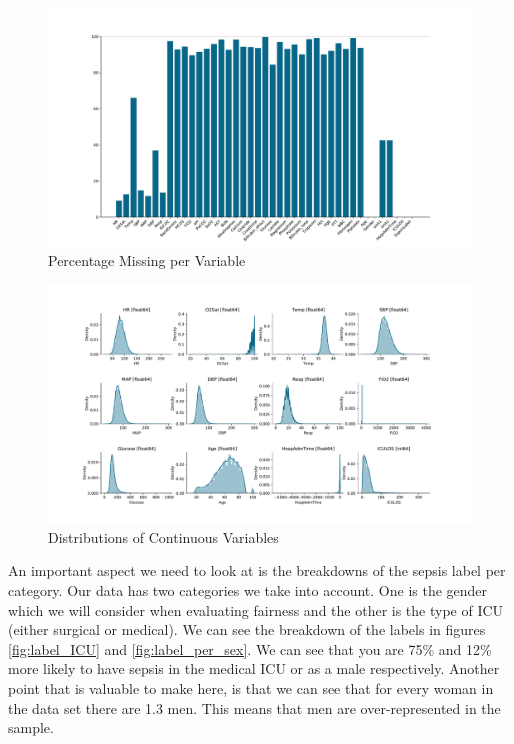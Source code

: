 \documentclass[10pt,letterpaper]{article}
\begin{document}
\begin{figure}[htbp!]
    \centering
    \includegraphics[scale = 0.45]{var_missing_hist.pdf}
    \caption{Percentage Missing per Variable}
    \label{fig:var_missings}
\end{figure}

\begin{figure}[htbp!]
    \centering
    \includegraphics[scale = 0.45]{var_dists.pdf}
    \caption{Distributions of Continuous Variables}
    \label{fig:var_dists}
\end{figure}

\par An important aspect we need to look at is the breakdowns of the sepsis label per category. Our data has two categories we take into account. One is the gender which we will consider when evaluating fairness and the other is the type of ICU (either surgical or medical). We can see the breakdown of the labels in figures \ref{fig:label_ICU} and \ref{fig:label_per_sex}. We can see that you are 75\% and 12\% more likely to have sepsis in the medical ICU or as a male respectively. Another point that is valuable to make here, is that we can see that for every woman in the data set there are 1.3 men. This means that men are over-represented in the sample.
\end{document}
